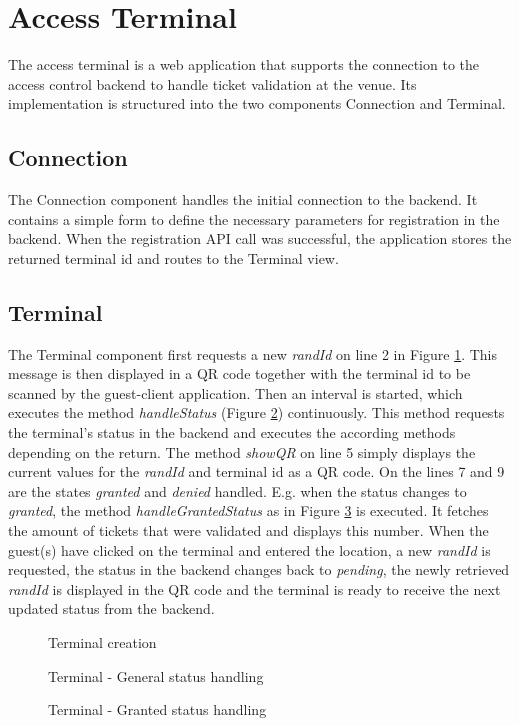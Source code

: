 \section{Access Terminal}\label{imp:terminal}
The access terminal is a web application that supports the connection to the access control backend to handle ticket validation at the venue. Its implementation is structured into the two components Connection and Terminal.

\subsection{Connection}
The Connection component handles the initial connection to the backend. It contains a simple form to define the necessary parameters for registration in the backend. When the registration API call was successful, the application stores the returned terminal id and routes to the Terminal view.

\subsection{Terminal}
The Terminal component first requests a new \textit{randId} on line 2 in Figure \ref{code:terminal-start}. This message is then displayed in a QR code together with the terminal id to be scanned by the guest-client application. Then an interval is started, which executes the method \textit{handleStatus} (Figure \ref{code:terminal-status-handling}) continuously. This method requests the terminal's status in the backend and executes the according methods depending on the return. The method \textit{showQR} on line 5 simply displays the current values for the \textit{randId} and terminal id as a QR code. On the lines 7 and 9 are the states \textit{granted} and \textit{denied} handled. E.g. when the status changes to \textit{granted}, the method \textit{handleGrantedStatus} as in Figure \ref{code:terminal-handle-granted} is executed. It fetches the amount of tickets that were validated and displays this number. When the guest(s) have clicked on the terminal and entered the location, a new \textit{randId} is requested, the status in the backend changes back to \textit{pending}, the newly retrieved \textit{randId} is displayed in the QR code and the terminal is ready to receive the next updated status from the backend.

\begin{figure}[H]
    
    \caption{Terminal creation}
    \label{code:terminal-start}
\end{figure}

\begin{figure}[H]
    
    \caption{Terminal - General status handling}
    \label{code:terminal-status-handling}
\end{figure}

\begin{figure}[H]
    
    \caption{Terminal - Granted status handling}
    \label{code:terminal-handle-granted}
\end{figure}
